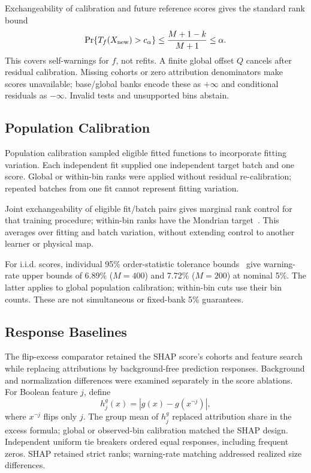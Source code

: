 \documentclass[conference]{IEEEtran}
\begin{document}
Exchangeability of calibration and future reference scores gives the standard rank bound~\cite{vovk2005algorithmic,vovk2012conditional}
\begin{equation}
 \Pr\{T_f(X_{\rm new})>c_\alpha\}\leq\frac{M+1-k}{M+1}\leq\alpha.
 \label{eq:rank}
\end{equation}
This covers self-warnings for $f$, not refits. A finite global offset $Q$ cancels after residual calibration. Missing cohorts or zero attribution denominators make scores unavailable; base/global banks encode these as $+\infty$ and conditional residuals as $-\infty$. Invalid tests and unsupported bins abstain.

\subsection{Population Calibration}
Population calibration sampled eligible fitted functions to incorporate fitting variation. Each independent fit supplied one independent target batch and one score. Global or within-bin ranks were applied without residual re-calibration; repeated batches from one fit cannot represent fitting variation.

Joint exchangeability of eligible fit/batch pairs gives marginal rank control for that training procedure; within-bin ranks have the Mondrian target~\cite{vovk2005algorithmic,vovk2012conditional}. This averages over fitting and batch variation, without extending control to another learner or physical map.

For i.i.d. scores, individual 95\% order-statistic tolerance bounds~\cite{vovk2012conditional} give warning-rate upper bounds of 6.89\% ($M=400$) and 7.72\% ($M=200$) at nominal 5\%. The latter applies to global population calibration; within-bin cuts use their bin counts. These are not simultaneous or fixed-bank 5\% guarantees.

\subsection{Response Baselines}
The flip-excess comparator retained the SHAP score's cohorts and feature search while replacing attributions by background-free prediction responses. Background and normalization differences were examined separately in the score ablations. For Boolean feature $j$, define
\begin{equation}
 h_j^g(x)=|g(x)-g(x^{\lnot j})|,
\end{equation}
where $x^{\lnot j}$ flips only $j$. The group mean of $h_j^g$ replaced attribution share in the excess formula; global or observed-bin calibration matched the SHAP design. Independent uniform tie breakers ordered equal responses, including frequent zeros. SHAP retained strict ranks; warning-rate matching addressed realized size differences.
\end{document}
